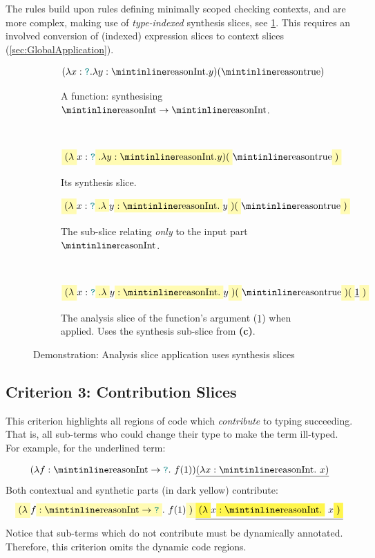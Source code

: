 The rules build upon rules defining minimally scoped checking contexts, and are more complex, making use of \textit{type-indexed} synthesis slices, see \cref{fig:AnalysisSliceApplication}. This requires an involved conversion of (indexed) expression slices to context slices (\cref{sec:GlobalApplication}).
\begin{figure}[h]
\centering
\begin{subfigure}{0.4\textwidth}
\[(\lambda x : \dyn. \lambda y : \code{Int}. y)(\code{true})\]
\caption{A function: synthesising $\code{Int} \to \code{Int}$.}
\end{subfigure}$\qquad$
\begin{subfigure}{0.4\textwidth}
\[\hlcmaths[yellow!30]{(\lambda} x : \dyn\hlcmaths[yellow!30]{. \lambda y : \code{Int}. y)(}\code{true}\hlcmaths[yellow!30]{)}\]
\caption{Its synthesis slice.}
\end{subfigure}
\begin{subfigure}{0.4\textwidth}
\[\hlcmaths[yellow!30]{(\lambda} x : \dyn\hlcmaths[yellow!30]{. \lambda} y \hlcmaths[yellow!30]{: \code{Int}.} y\hlcmaths[yellow!30]{)(}\code{true}\hlcmaths[yellow!30]{)}\]
\caption{The sub-slice relating \textit{only} to the input part $\code{Int}$.}
\end{subfigure}$\qquad$
\begin{subfigure}{0.4\textwidth}
\[\hlcmaths[yellow!30]{(\lambda} x : \dyn\hlcmaths[yellow!30]{. \lambda} y \hlcmaths[yellow!30]{: \code{Int}.} y\hlcmaths[yellow!30]{)(}\code{true}\hlcmaths[yellow!30]{)(}\underline{1}\hlcmaths[yellow!30]{)}\]
\caption{The analysis slice of the function's argument ($\underline{1}$) when applied. Uses the synthesis sub-slice from \textbf{(c)}.}
\end{subfigure}
\caption{Demonstration: Analysis slice application uses synthesis slices}
\label{fig:AnalysisSliceApplication}
\end{figure}

\subsection{Criterion 3: Contribution Slices}
\label{sec:ContributionSlices}
This criterion highlights all regions of code which \textit{contribute} to typing succeeding. That is, all sub-terms who could change their type to make the term ill-typed. For example, for the underlined term:

\[(\lambda f: \code{Int} \to \dyn.\ f(1))\underline{(\lambda x : \code{Int}.\ x)}\]
Both contextual and synthetic parts (in dark yellow) contribute:
\[\hlcmaths[yellow!30]{(\lambda} f\hlcmaths[yellow!30]{: \code{Int} \to \dyn}.\ f(1)\hlcmaths[yellow!30]{)}\underline{\hlcmaths[yellow!70]{(\lambda} x \hlcmaths[yellow!70]{: \code{Int}.}\ x\hlcmaths[yellow!70]{)}}\]
Notice that sub-terms which do not contribute must be dynamically annotated. Therefore, this criterion omits the dynamic code regions.

